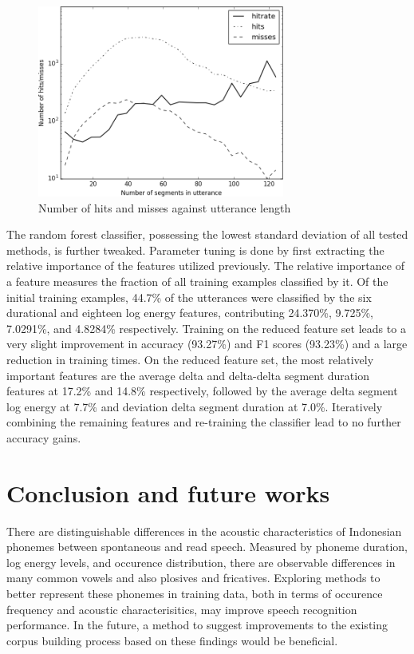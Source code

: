\documentclass[conference]{IEEEtran}
\begin{document}
\begin{figure}[!htb]
\centering
\includegraphics[width=3.2in]{hitrate}
    \caption{Number of hits and misses against utterance length}
\label{hit_rate}
\end{figure}

The random forest classifier, possessing the lowest standard deviation of all tested methods, is further tweaked.
Parameter tuning is done by first extracting the relative importance of the features utilized previously.
The relative importance of a feature measures the fraction of all training examples classified by it.
Of the initial training examples, 44.7\% of the utterances were classified by the six durational and eighteen log energy features, contributing 24.370\%, 9.725\%, 7.0291\%, and 4.8284\% respectively.
Training on the reduced feature set leads to a very slight improvement in accuracy (93.27\%) and F1 scores (93.23\%) and a large reduction in training times.
On the reduced feature set, the most relatively important features are the average delta and delta-delta segment duration features at 17.2\% and 14.8\% respectively, followed by the average delta segment log energy at 7.7\% and deviation delta segment duration at 7.0\%.
Iteratively combining the remaining features and re-training the classifier lead to no further accuracy gains.

\section{Conclusion and future works}

There are distinguishable differences in the acoustic characteristics of Indonesian phonemes between spontaneous and read speech.
Measured by phoneme duration, log energy levels, and occurence distribution, there are observable differences in many common vowels and also plosives and fricatives.
Exploring methods to better represent these phonemes in training data, both in terms of occurence frequency and acoustic characterisitics, may improve speech recognition performance.
In the future, a method to suggest improvements to the existing corpus building process based on these findings would be beneficial.
\end{document}
